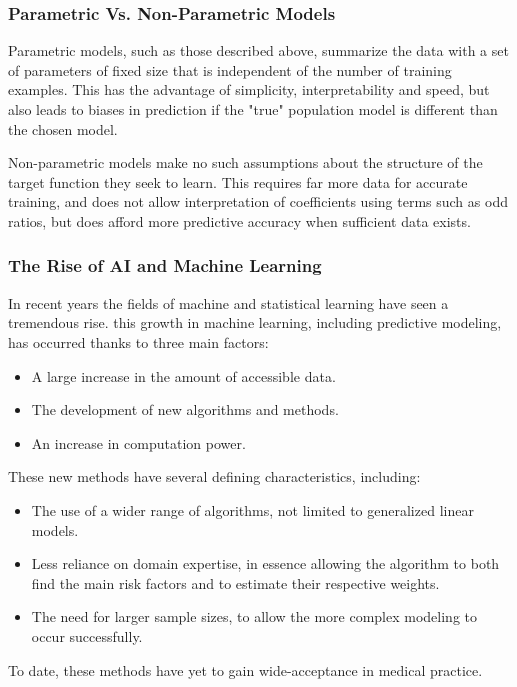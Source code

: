 \documentclass[a4paper,12pt]{article}
\begin{document}
			\subsubsection{Parametric Vs. Non-Parametric Models}
			Parametric models, such as those described above, summarize the data with a set of parameters of fixed size that is independent of the number of training examples. This has the advantage of simplicity, interpretability and speed, but also leads to biases in prediction if the "true" population model is different than the chosen model.
			
			Non-parametric models make no such assumptions about the structure of the target function they seek to learn. This requires far more data for accurate training, and does not allow interpretation of coefficients using terms such as odd ratios, but does afford more predictive accuracy when sufficient data exists\cite{Russell2002}.
			
			\subsubsection{The Rise of AI and Machine Learning}
		
			In recent years the fields of machine and statistical learning have seen a tremendous rise\cite{Obermeyer2016}. this growth in machine learning, including predictive modeling, has occurred thanks to three main factors\cite{Shalev-Shwartz2014}:
			\begin{itemize}
				\item A large increase in the amount of accessible data.
				\item The development of new algorithms and methods.
				\item An increase in computation power.
			\end{itemize} 
			These new methods have several defining characteristics, including:
			\begin{itemize}
				\item The use of a wider range of algorithms, not limited to generalized linear models.
				\item Less reliance on domain expertise, in essence allowing the algorithm to both find the main risk factors and to estimate their respective weights.
				\item The need for larger sample sizes, to allow the more complex modeling to occur successfully.
			\end{itemize}
			To date, these methods have yet to gain wide-acceptance in medical practice\cite{Obermeyer2016,Deo2015}.
			
\end{document}
